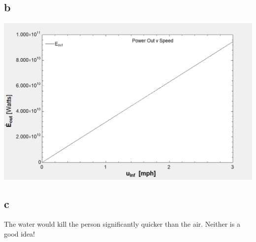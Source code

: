 \documentclass[]{report}
\begin{document}
\subsection{b}

\begin{center}
	\includegraphics[width=0.7\linewidth]{"../3.b-graph"}
\end{center}



\subsection{c}


The water would kill the person significantly quicker than the air.  Neither is a good idea!
\end{document}
